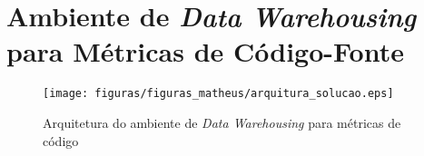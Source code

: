 \chapter{Ambiente de \textit{Data Warehousing} para Métricas de Código-Fonte}
\label{chap:arquitetura}



\begin{figure}[h!]
\centering
\texttt{[image: figuras/figuras\_matheus/arquitura\_solucao.eps]}
\caption{Arquitetura do ambiente de \textit{Data Warehousing} para métricas de código}
\label{fig:arquitetura_solucao}
\end{figure}
\FloatBarrier

